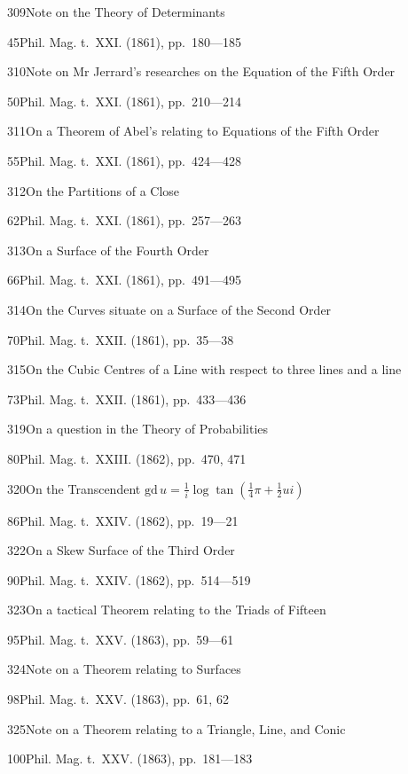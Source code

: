 \documentclass[11pt,a4paper]{book}
\providecommand{\tocentry}[2]{#1\dotfill #2\par}
\begin{document}
\tocentry{309}{Note on the Theory of Determinants}{45}{Phil. Mag. t.~XXI. (1861), pp.~180---185}

\tocentry{310}{Note on Mr Jerrard's researches on the Equation of the Fifth Order}{50}{Phil. Mag. t.~XXI. (1861), pp.~210---214}

\tocentry{311}{On a Theorem of Abel's relating to Equations of the Fifth Order}{55}{Phil. Mag. t.~XXI. (1861), pp.~424---428}

\tocentry{312}{On the Partitions of a Close}{62}{Phil. Mag. t.~XXI. (1861), pp.~257---263}

\newpage

\tocentry{313}{On a Surface of the Fourth Order}{66}{Phil. Mag. t.~XXI. (1861), pp.~491---495}

\tocentry{314}{On the Curves situate on a Surface of the Second Order}{70}{Phil. Mag. t.~XXII. (1861), pp.~35---38}

\tocentry{315}{On the Cubic Centres of a Line with respect to three lines and a line}{73}{Phil. Mag. t.~XXII. (1861), pp.~433---436}




\tocentry{319}{On a question in the Theory of Probabilities}{80}{Phil. Mag. t.~XXIII. (1862), pp.~470, 471}

\tocentry{320}{On the Transcendent $\mathrm{gd}\, u = \frac{1}{i}\log\tan(\frac{1}{4}\pi + \frac{1}{2}ui)$}{86}{Phil. Mag. t.~XXIV. (1862), pp.~19---21}


\tocentry{322}{On a Skew Surface of the Third Order}{90}{Phil. Mag. t.~XXIV. (1862), pp.~514---519}

\tocentry{323}{On a tactical Theorem relating to the Triads of Fifteen}{95}{Phil. Mag. t.~XXV. (1863), pp.~59---61}

\tocentry{324}{Note on a Theorem relating to Surfaces}{98}{Phil. Mag. t.~XXV. (1863), pp.~61, 62}

\tocentry{325}{Note on a Theorem relating to a Triangle, Line, and Conic}{100}{Phil. Mag. t.~XXV. (1863), pp.~181---183}
\end{document}
